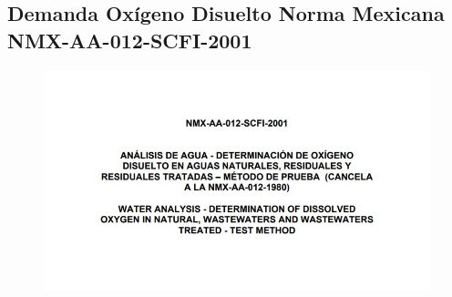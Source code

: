 \subsection*{Demanda Oxígeno Disuelto Norma Mexicana NMX-AA-012-SCFI-2001}
\begin{center} 
	\begin{figure}[h]
		\includegraphics*[scale=0.825]{../Images/NMX-AA-012-SCFI-2001.jpg}
	\end{figure}
\end{center}
\clearpage
